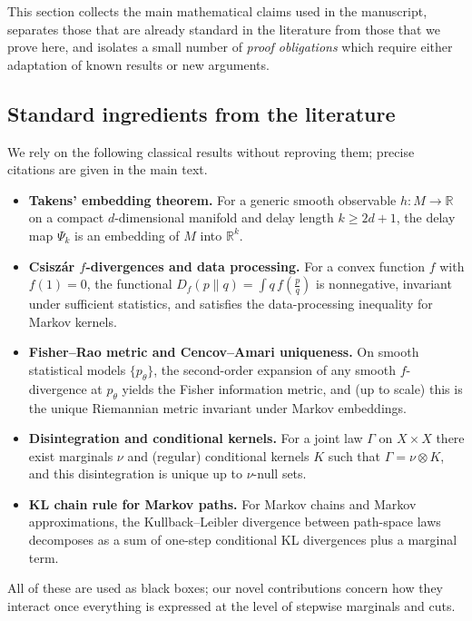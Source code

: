 \documentclass[11pt]{article}
\newcommand{\1}{\mathbf{1}}
\begin{document}
This section collects the main mathematical claims used in the manuscript, separates those that are already standard in the literature from those that we prove here, and isolates a small number of \emph{proof obligations} which require either adaptation of known results or new arguments.


\subsection{Standard ingredients from the literature}

We rely on the following classical results without reproving them; precise citations are given in the main text.

\begin{itemize}[leftmargin=1.5em]
  \item \textbf{Takens' embedding theorem.} For a generic smooth observable $h:M\to\mathbb{R}$ on a compact $d$-dimensional manifold and delay length $k\ge 2d+1$, the delay map $\Psi_k$ is an embedding of $M$ into $\mathbb{R}^k$.
  \item \textbf{Csiszár $f$-divergences and data processing.} For a convex function $f$ with $f(1)=0$, the functional
  \(
    D_f(p\|q) = \int q\, f\!\left(\frac{p}{q}\right)
  \)
  is nonnegative, invariant under sufficient statistics, and satisfies the data-processing inequality for Markov kernels.
  \item \textbf{Fisher--Rao metric and Cencov--Amari uniqueness.} On smooth statistical models $\{p_\theta\}$, the second-order expansion of any smooth $f$-divergence at $p_\theta$ yields the Fisher information metric, and (up to scale) this is the unique Riemannian metric invariant under Markov embeddings.
  \item \textbf{Disintegration and conditional kernels.} For a joint law $\Gamma$ on $X\times X$ there exist marginals $\nu$ and (regular) conditional kernels $K$ such that $\Gamma=\nu\otimes K$, and this disintegration is unique up to $\nu$-null sets.
  \item \textbf{KL chain rule for Markov paths.} For Markov chains and Markov approximations, the Kullback--Leibler divergence between path-space laws decomposes as a sum of one-step conditional KL divergences plus a marginal term.
\end{itemize}

All of these are used as black boxes; our novel contributions concern how they interact once everything is expressed at the level of stepwise marginals and cuts.
\end{document}
